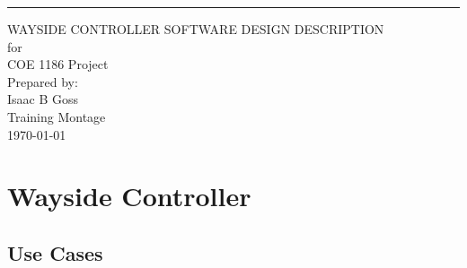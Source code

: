 \documentclass{scrreprt}
\begin{document}
\begin{flushright}
    \rule{16cm}{5pt}\vskip1cm
    \begin{bfseries}
        \Huge{WAYSIDE CONTROLLER SOFTWARE DESIGN DESCRIPTION}\\
        \vspace{.9cm}
        for\\
        \vspace{.9cm}
        COE 1186 Project\\
        \vspace{.9cm}
        \vspace{.9cm}
        Prepared by:\\
        Isaac B Goss\\
        \vspace{3.9cm}
        Training Montage\\
        \vspace{.9cm}
        \today\\
    \end{bfseries}
\end{flushright}

\tableofcontents

    \chapter{Wayside Controller}
    \section{Use Cases}
\end{document}
